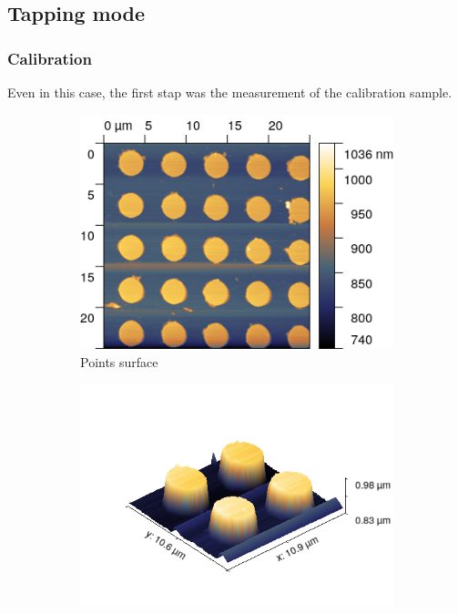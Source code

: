 \documentclass[11pt,a4paper]{article}
\begin{document}
\subsection{Tapping mode}

\subsubsection{Calibration}
Even in this case, the first stap was the measurement of the calibration sample.

\begin{figure}[H]
\centering
\begin{subfigure}[b]{0.45\textwidth}
\includegraphics[width=\textwidth]{tm_points}
\caption{Points surface}
\label{fig:}
\end{subfigure}
\begin{subfigure}[b]{0.45\textwidth}
\includegraphics[width=\textwidth]{tm_points_3D}

\end{subfigure}
\end{figure}
\end{document}
